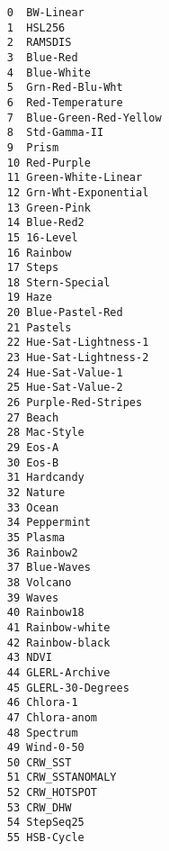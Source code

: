 \begin{description}
\begin{verbatim}
     0  BW-Linear
     1  HSL256
     2  RAMSDIS
     3  Blue-Red
     4  Blue-White
     5  Grn-Red-Blu-Wht
     6  Red-Temperature
     7  Blue-Green-Red-Yellow
     8  Std-Gamma-II
     9  Prism
     10 Red-Purple
     11 Green-White-Linear
     12 Grn-Wht-Exponential
     13 Green-Pink
     14 Blue-Red2
     15 16-Level
     16 Rainbow
     17 Steps
     18 Stern-Special
     19 Haze
     20 Blue-Pastel-Red
     21 Pastels
     22 Hue-Sat-Lightness-1
     23 Hue-Sat-Lightness-2
     24 Hue-Sat-Value-1
     25 Hue-Sat-Value-2
     26 Purple-Red-Stripes
     27 Beach
     28 Mac-Style
     29 Eos-A
     30 Eos-B
     31 Hardcandy
     32 Nature
     33 Ocean
     34 Peppermint
     35 Plasma
     36 Rainbow2
     37 Blue-Waves
     38 Volcano
     39 Waves
     40 Rainbow18
     41 Rainbow-white
     42 Rainbow-black
     43 NDVI
     44 GLERL-Archive
     45 GLERL-30-Degrees
     46 Chlora-1
     47 Chlora-anom
     48 Spectrum
     49 Wind-0-50
     50 CRW_SST
     51 CRW_SSTANOMALY
     52 CRW_HOTSPOT
     53 CRW_DHW
     54 StepSeq25
     55 HSB-Cycle
   

\end{verbatim}
\end{description}
